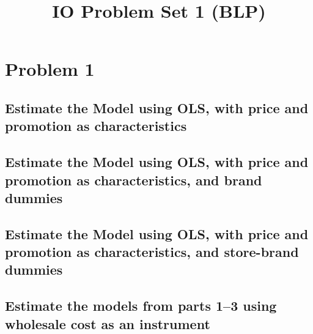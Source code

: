 \documentclass[dvipsnames]{article}
\title{IO Problem Set 1 (BLP)}
\begin{document}
\maketitle
\section*{Problem 1}
\subsection*{Estimate the Model using OLS, with price and promotion as characteristics}

\begin{table}
  \centering
  
\end{table}
\newpage

\subsection*{Estimate the Model using OLS, with price and promotion as characteristics, and brand dummies}

\begin{table}
  \centering
  
  \end{table}
  \newpage

\subsection*{Estimate the Model using OLS, with price and promotion as characteristics, and store-brand dummies}

\begin{table}
  \centering
  
  \end{table}
  \newpage

\subsection*{Estimate the models from parts 1--3 using wholesale cost as an instrument}

\begin{table}
  \centering
  
  \end{table}
  \newpage

\begin{table}
  \centering
  
  \end{table}

\begin{table}
  \centering
  
  \end{table}
\end{document}
